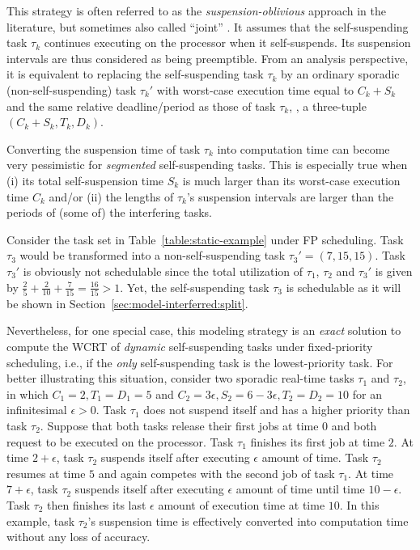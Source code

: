 \label{sec:model-interferred-oblivious}

This strategy is often referred to as the \emph{suspension-oblivious} approach in the literature, but sometimes also called ``joint'' \cite{bletsas:thesis}. It assumes that the self-suspending task $\tau_k$ continues executing on the processor when it self-suspends. Its suspension intervals are thus considered as being preemptible. From an analysis perspective, it is equivalent to replacing the self-suspending task $\tau_k$ by an ordinary sporadic (non-self-suspending) task $\tau_k'$ with worst-case execution time equal to $C_k + S_k$ and the same relative deadline/period as those of task $\tau_k$, \ie, a three-tuple $(C_k+S_k, T_k, D_k)$. 

Converting the suspension time of task $\tau_k$ into computation time can become very pessimistic for \emph{segmented} self-suspending tasks. This is especially true when (i) its total self-suspension time $S_k$ is much larger than its worst-case execution time $C_k$ and/or (ii) the lengths of $\tau_k$'s suspension intervals are larger than the periods of (some of) the interfering tasks. 

\begin{example}
\label{ex:suspension-as-comput}   
Consider the task set in Table~\ref{table:static-example} under FP scheduling. Task $\tau_3$ would be transformed into a non-self-suspending task $\tau_3'=(7,15,15)$. Task $\tau_3'$ is obviously not schedulable since the total utilization of $\tau_1$, $\tau_2$ and $\tau_3'$ is given by $\frac{2}{5} + \frac{2}{10} + \frac{7}{15} = \frac{16}{15} > 1$. Yet, the self-suspending task $\tau_3$ is schedulable as it will be shown in Section~\ref{sec:model-interferred:split}.
\hfill\myendproof  
\end{example}

Nevertheless, for one special case, this modeling strategy is an \emph{exact} solution to compute the WCRT of \emph{dynamic} self-suspending tasks under fixed-priority scheduling, i.e., if the \emph{only} self-suspending task is the lowest-priority task.
For better illustrating this situation, consider two sporadic real-time tasks $\tau_1$ and $\tau_2$, in which $C_1=2, T_1=D_1=5$ and $C_2=3\epsilon, S_2=6-3\epsilon, T_2=D_2=10$ for an infinitesimal $\epsilon >0$. Task $\tau_1$ does not suspend itself and has a higher priority than task $\tau_2$. Suppose that both tasks release their first jobs at time $0$ and both request to be executed on the processor. Task $\tau_1$ finishes its first job at time $2$. At time $2+\epsilon$, task $\tau_2$ suspends itself after executing $\epsilon$ amount of time. Task $\tau_2$ resumes at time $5$ and again competes with the second job of task $\tau_1$.  At time $7+\epsilon$, task $\tau_2$ suspends itself after executing $\epsilon$ amount of time until time $10-\epsilon$. Task $\tau_2$ then finishes its last $\epsilon$ amount of execution time at time $10$. In this example, task $\tau_2$'s suspension time is effectively converted into computation time without any loss of accuracy. 


